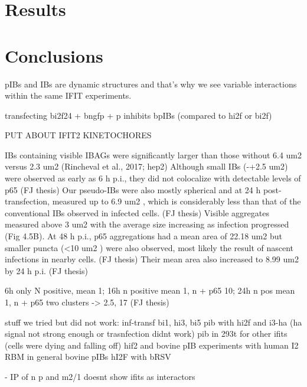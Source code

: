 \section{Results} \label{sec:Results-Chapter4}



\section{Conclusions} \label{sec:Conclusions-Chapter4}
pIBs and IBs are dynamic structures and that's why we see variable interactions within the same IFIT experiments.

transfecting bi2f24 + bngfp + p inhibits bpIBs (compared to hi2f or bi2f)



PUT ABOUT IFIT2 KINETOCHORES

IBs containing visible IBAGs were significantly larger than those without 6.4 um2 versus 2.3 um2 (Rincheval et al., 2017; hep2)
Although small IBs (-+2.5 um2) were observed as early as 6 h p.i., they did not colocalize with detectable levels of p65 (FJ thesis)
Our pseudo-IBs were also mostly spherical and at 24 h post-transfection, measured up to 6.9 um2 , which is considerably less than that of the conventional IBs observed in infected cells. (FJ thesis)
Visible aggregates measured above 3 um2 with the average size increasing as infection progressed (Fig 4.5B). At 48 h p.i., p65 aggregations had a mean area of 22.18 um2 but smaller puncta (<10 um2 ) were also observed, most likely the result of nascent infections in nearby cells. (FJ thesis)
Their mean area also increased to 8.99 um2 by 24 h p.i. (FJ thesis)

6h only N positive, mean 1; 16h n positive mean 1, n + p65 10; 24h n pos mean 1, n + p65 two clusters -> 2.5, 17 (FJ thesis)

stuff we tried but did not work: 
inf-transf bi1, hi3, bi5
pib with hi2f and i3-ha (ha signal not strong enough or trasnfection didnt work)
pib in 293t for other ifits (cells were dying and falling off)
hif2 and bovine pIB
experiments with human I2 RBM
in general bovine pIBs
hI2F with bRSV



\cite{Oliveira2013HumanCells} - IP of n p and m2/1 doesnt show ifits as interactors 

